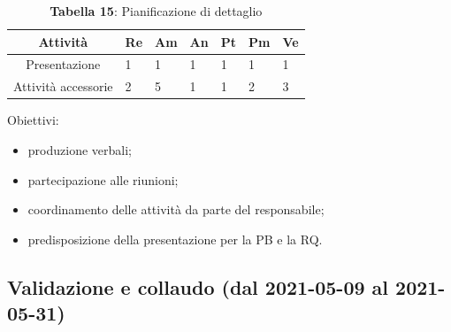 \begin{table}[H]
	\centering
	\renewcommand{\arraystretch}{1.5}
	\begin{tabular}{|c|p{10mm}|p{10mm}|p{10mm}|p{10mm}|p{10mm}|p{10mm}|}
		\hline
		\rowcolor{lighter-grayer}
		\textbf{Attività}                         & \textbf{Re} & \textbf{Am} & \textbf{An} & \textbf{Pt} & \textbf{Pm} & \textbf{Ve} \\ \hline
		
		Presentazione       & 1           & 1           & 1           & 1           & 1           & 1           \\ \hline
		Attività accessorie & 2           & 5           & 1           & 1           & 2           & 3           \\ \hline
		
	\end{tabular}
	\caption*{\textbf{Tabella 15}: Pianificazione di dettaglio\\}
\end{table}

Obiettivi:
\begin{itemize}
	\item produzione verbali;
	\item partecipazione alle riunioni;
	\item coordinamento delle attività da parte del responsabile;
	\item predisposizione della presentazione per la PB e la RQ.
\end{itemize}

\subsection{Validazione e collaudo (dal 2021-05-09 al 2021-05-31)}


